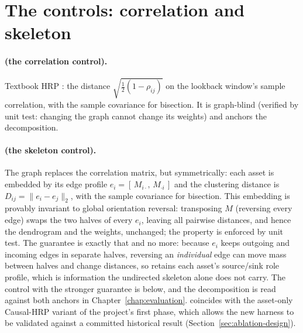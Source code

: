 \section{The controls: correlation and skeleton}
\label{sec:controls}

\paragraph{\HRP{} (the correlation control).} Textbook HRP
\cite{lopezdeprado2016hrp}: the distance $\sqrt{\tfrac{1}{2}(1-\rho_{ij})}$
on the
lookback window's sample correlation, with the sample covariance for
bisection. It is
graph-blind (verified by unit test: changing the graph cannot change its
weights) and anchors the decomposition.

\paragraph{\skelsamp{} (the skeleton control).} The graph replaces the
correlation matrix,
but symmetrically: each asset is embedded by its edge profile
$e_i = [\,M_{i\cdot},\, M_{\cdot i}\,]$ and the clustering distance is
$D_{ij} = \lVert e_i - e_j \rVert_2$, with the sample covariance for
bisection.
This embedding is provably invariant to global orientation reversal:
transposing $M$
(reversing every edge) swaps the two halves of every $e_i$, leaving all
pairwise distances, and hence the dendrogram and the weights, unchanged;
the property is enforced by unit test. The guarantee is exactly that and
no more: because $e_i$ keeps outgoing and incoming edges in separate
halves, reversing an \emph{individual} edge can move mass between halves
and change distances, so \skelsamp{} retains each asset's source/sink
role profile, which is information the undirected skeleton alone does not
carry. The control with the stronger guarantee is \skelalt{} below, and
the decomposition is read against both anchors in
Chapter~\ref{chap:evaluation}. \skelsamp{} coincides with
the
asset-only Causal-HRP variant of the project's first phase, which allows the
new harness to be validated against a
committed historical result (Section~\ref{sec:ablation-design}).

